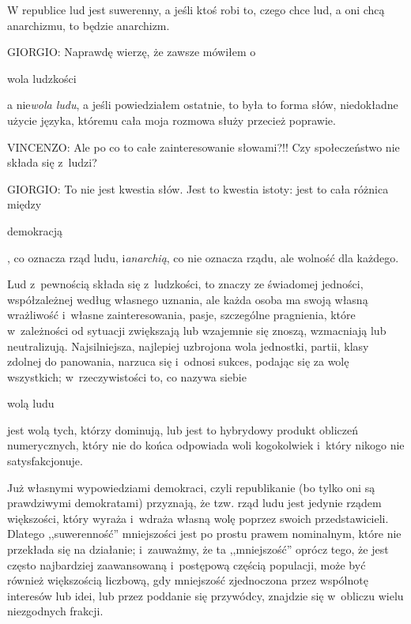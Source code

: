 \documentclass[oneside,polish,11pt,sfheadings]{mwbk}
\begin{document}
 
W republice lud jest suwerenny, a jeśli ktoś robi to, czego chce lud, a oni chcą anarchizmu, to będzie anarchizm. 




 
\noindent GIORGIO: Naprawdę wierzę, że zawsze mówiłem o \begin{itshape}wola ludzkości \end{itshape} a
nie\textit{wola ludu}, a jeśli powiedziałem ostatnie, to była to forma słów, niedokładne użycie języka, któremu
cała moja rozmowa służy przecież poprawie. 




 
\noindent VINCENZO: Ale po co to całe zainteresowanie słowami?!! Czy społeczeństwo nie składa się z~ludzi? 




 
\noindent GIORGIO: To nie jest kwestia słów. Jest to kwestia istoty: jest to cała różnica między
\begin{itshape}demokracją \end{itshape}, co oznacza rząd ludu, i\textit{anarchią}, co
nie oznacza rządu, ale wolność dla każdego. 

 
Lud z~pewnością składa się z~ludzkości, to znaczy ze świadomej jedności, współzależnej według własnego uznania, ale
każda osoba ma swoją własną wrażliwość i~własne zainteresowania, pasje, szczególne pragnienia, które w~zależności od
sytuacji zwiększają lub wzajemnie się znoszą, wzmacniają lub neutralizują. Najsilniejsza, najlepiej uzbrojona wola
jednostki, partii, klasy zdolnej do panowania, narzuca się i~odnosi sukces, podając się za wolę wszystkich; w~rzeczywistości to, co nazywa siebie \begin{itshape}wolą ludu \end{itshape} jest wolą tych,
którzy dominują, lub jest to hybrydowy produkt obliczeń numerycznych, który nie do końca odpowiada woli kogokolwiek i~który nikogo nie satysfakcjonuje. 

 
Już własnymi wypowiedziami demokraci, czyli republikanie (bo tylko oni są prawdziwymi demokratami) przyznają, że tzw.
rząd ludu jest jedynie rządem większości, który wyraża i~wdraża własną wolę poprzez swoich przedstawicieli. Dlatego
,,suwerenność'' mniejszości jest po prostu prawem nominalnym, które nie przekłada się na działanie; i~zauważmy, że ta
,,mniejszość'' oprócz tego, że jest często najbardziej zaawansowaną i~postępową częścią populacji, może być również
większością liczbową, gdy mniejszość zjednoczona przez wspólnotę interesów lub idei, lub przez poddanie się przywódcy,
znajdzie się w~obliczu wielu niezgodnych frakcji. 
\end{document}
